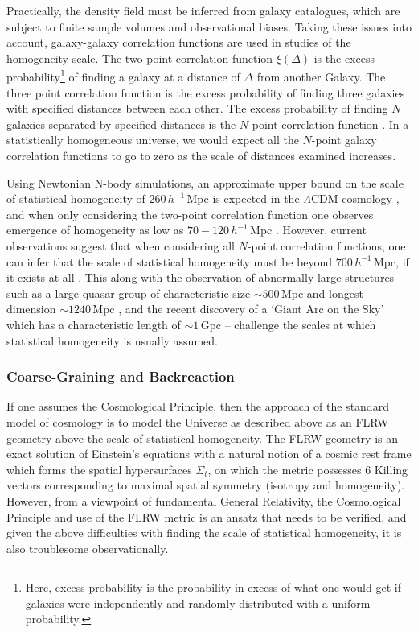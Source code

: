 \documentclass[a4paper,12pt]{report}
\begin{document}
Practically, the density field must be inferred from galaxy catalogues, which are subject to finite sample volumes and observational biases. Taking these issues into account, galaxy-galaxy correlation functions are used in studies of the homogeneity scale. The two point correlation function $\xi(\Delta)$ is the excess probability\footnote{Here, excess probability is the probability in excess of what one would get if galaxies were independently and randomly distributed with a uniform probability.} of finding a galaxy at a distance of $\Delta$ from another Galaxy. The three point correlation function is the excess probability of finding three galaxies with specified distances between each other. The excess probability of finding $N$ galaxies separated by specified distances is the $N$-point correlation function \cite{RN118}. In a statistically homogeneous universe, we would expect all the $N$-point galaxy correlation functions to go to zero as the scale of distances examined increases.

Using Newtonian N-body simulations, an approximate upper bound on the scale of statistical homogeneity of $260\,h^{-1}\,$Mpc is expected in the $\Lambda$CDM cosmology \cite{RN152}, and when only considering the two-point correlation function one observes emergence of homogeneity as low as $70 - 120 \, h^{-1}\,$Mpc \cite{RN52,RN53}. However, current observations suggest that when considering all $N$-point correlation functions, one can infer that the scale of statistical homogeneity must be beyond $700\, h^{-1}\,$Mpc, if it exists at all \cite{RN202}. This along with the observation of abnormally large structures -- such as a large quasar group of characteristic size $\sim 500\,$Mpc and longest dimension $\sim1240\,$Mpc \cite{RN49}, and the recent discovery of a `Giant Arc on the Sky' which has a characteristic length of $\sim 1\,$Gpc \cite{RN225} -- challenge the scales at which statistical homogeneity is usually assumed.

\subsubsection{Coarse-Graining and Backreaction}
If one assumes the Cosmological Principle, then the approach of the standard model of cosmology is to model the Universe as described above as an FLRW geometry above the scale of statistical homogeneity. The FLRW geometry is an exact solution of Einstein's equations with a natural notion of a cosmic rest frame which forms the spatial hypersurfaces $\Sigma_t$, on which the metric possesses 6 Killing vectors corresponding to maximal spatial symmetry (isotropy and homogeneity). However, from a viewpoint of fundamental General Relativity, the Cosmological Principle and use of the FLRW metric is an ansatz that needs to be verified, and given the above difficulties with finding the scale of statistical homogeneity, it is also troublesome observationally.
\end{document}
